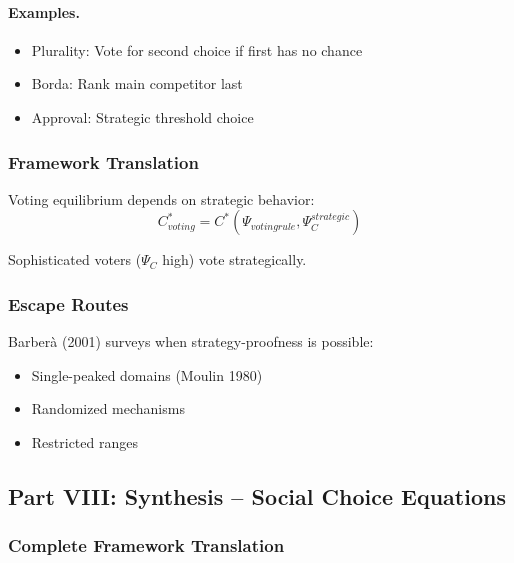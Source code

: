 \paragraph{Examples.}
\begin{itemize}
    \item Plurality: Vote for second choice if first has no chance
    \item Borda: Rank main competitor last
    \item Approval: Strategic threshold choice
\end{itemize}

\subsubsection{Framework Translation}

Voting equilibrium depends on strategic behavior:
\begin{equation}
C^*_{voting} = C^*(\Psi_{voting rule}, \Psi_C^{strategic})
\end{equation}

Sophisticated voters ($\Psi_C$ high) vote strategically.

\subsubsection{Escape Routes}

Barberà (2001) surveys when strategy-proofness is possible:
\begin{itemize}
    \item Single-peaked domains (Moulin 1980)
    \item Randomized mechanisms
    \item Restricted ranges
\end{itemize}

\subsection{Part VIII: Synthesis – Social Choice Equations}

\subsubsection{Complete Framework Translation}

